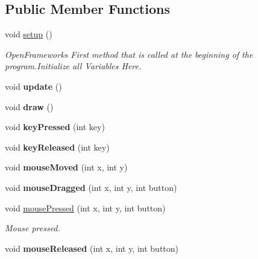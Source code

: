 \subsection*{Public Member Functions}
\begin{DoxyCompactItemize}
\item 
\hypertarget{classtest_app_ad431db15b6150b965cd52bcba8e16e11}{void \hyperlink{classtest_app_ad431db15b6150b965cd52bcba8e16e11}{setup} ()}\label{classtest_app_ad431db15b6150b965cd52bcba8e16e11}

\begin{DoxyCompactList}\small\item\em Open\-Frameworks First method that is called at the beginning of the program.\-Initialize all Variables Here. \end{DoxyCompactList}\item 
\hypertarget{classtest_app_afb39d201aec71a295b7609876bf7d0c6}{void {\bfseries update} ()}\label{classtest_app_afb39d201aec71a295b7609876bf7d0c6}

\item 
\hypertarget{classtest_app_af869cba67b1dab8481f8d0e216d59dcd}{void {\bfseries draw} ()}\label{classtest_app_af869cba67b1dab8481f8d0e216d59dcd}

\item 
\hypertarget{classtest_app_a904d147c7e532cb92656d5dd4895cd26}{void {\bfseries key\-Pressed} (int key)}\label{classtest_app_a904d147c7e532cb92656d5dd4895cd26}

\item 
\hypertarget{classtest_app_a1116a10088e4932f6d482efe723cd45e}{void {\bfseries key\-Released} (int key)}\label{classtest_app_a1116a10088e4932f6d482efe723cd45e}

\item 
\hypertarget{classtest_app_a33541b19eff9f8285b2487bfc146d58b}{void {\bfseries mouse\-Moved} (int x, int y)}\label{classtest_app_a33541b19eff9f8285b2487bfc146d58b}

\item 
\hypertarget{classtest_app_a075bcc2be16fd8f3eaa9162fb40a0a1f}{void {\bfseries mouse\-Dragged} (int x, int y, int button)}\label{classtest_app_a075bcc2be16fd8f3eaa9162fb40a0a1f}

\item 
void \hyperlink{classtest_app_a3f200702ce91859cac2872a39302679d}{mouse\-Pressed} (int x, int y, int button)
\begin{DoxyCompactList}\small\item\em Mouse pressed. \end{DoxyCompactList}\item 
\hypertarget{classtest_app_aa3680ffc782b1e5c451289817f20c9c6}{void {\bfseries mouse\-Released} (int x, int y, int button)}\label{classtest_app_aa3680ffc782b1e5c451289817f20c9c6}


\end{DoxyCompactItemize}
